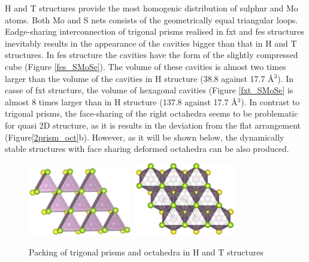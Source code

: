 \documentclass[a4paperm]{article}
\begin{document}
H and T structures provide the most homogenic distribution of sulphur and Mo atoms. 
Both Mo and S nets consists of the geometrically equal triangular loops.
Eadge-sharing interconnection of trigonal prisms realised in fxt and fes structures inevitably results in the appearance of the cavities bigger than that in H and T structures. 
In fes structure the cavities have the form of the slightly compressed cube (Figure \ref{fes_SMoSe}).
The volume of these cavities is almost two times larger than the volume of the cavities in H structure (38.8 against 17.7 \AA$^3$).
In casse of fxt structure, the volume of hexagonal cavities (Figure \ref{fxt_SMoSe} is almost 8 times larger than in H structure (137.8 against 17.7 \AA$^3$).
In contrast to trigonal prisms, the face-sharing of the right octahedra seems to be problematic for quasi 2D structure, as it is results in the deviation from the flat arrangement (Figure\ref{2prism_oct}b).
However, as it will be shown below, the dynamically stable structures with face sharing deformed octahedra can be also produced. 


\begin{figure}[H]
        \includegraphics[width=0.4\textwidth]{1H.jpg}
        \includegraphics[width=0.4\textwidth]{1T.jpg}
        \caption{Packing of trigonal prisms and octahedra in H and T structures}
\label{1H1T}
\label{fes_fxt}
\end{figure}
\end{document}
